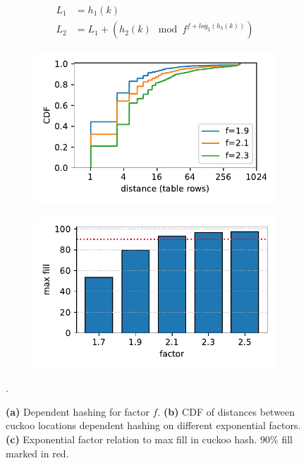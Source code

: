 \begin{figure}[t]
    \centering
    \begin{subfigure}{0.3\linewidth}
        \begin{align*}
            L_1 &= h_1(k) \\
            L_2 &= L_1 + (h_2(k)\mod f^{f + log_2(h_3(k))})
        \end{align*}
    \end{subfigure}
    \begin{subfigure}{0.3\linewidth}
        \includegraphics[width=0.99\linewidth]{fig/hash_factor.pdf}
    \end{subfigure}
    \begin{subfigure}{0.3\linewidth}
        \includegraphics[width=0.99\linewidth]{fig/hash_fill.pdf}
    \end{subfigure}.
    \vspace{-1em}
    \caption{
    \textbf{(a)} Dependent hashing for factor $f$.
    \textbf{(b)} CDF of distances between cuckoo locations dependent hashing on different exponential factors.
    \textbf{(c)} Exponential factor relation to max fill in cuckoo hash. 90\% fill marked in red.
    }
    \label{fig:locality-hashing}

\end{figure}

